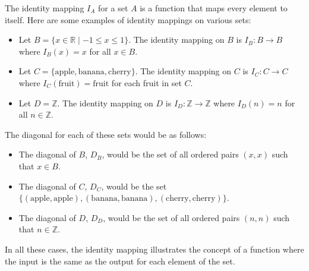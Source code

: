    \begin{example}
   	The identity mapping $I_A$ for a set $A$ is a function that maps every element to itself. Here are some examples of identity mappings on various sets:
   	
   	\begin{itemize}
   		\item Let $B = \{x \in \mathbb{R} \mid -1 \leq x \leq 1\}$. The identity mapping on $B$ is $I_B : B \to B$ where $I_B(x) = x$ for all $x \in B$.
   		
   		\item Let $C = \{\text{apple}, \text{banana}, \text{cherry}\}$. The identity mapping on $C$ is $I_C : C \to C$ where $I_C(\text{fruit}) = \text{fruit}$ for each fruit in set $C$.
   		
   		\item Let $D = \mathbb{Z}$. The identity mapping on $D$ is $I_D : \mathbb{Z} \to \mathbb{Z}$ where $I_D(n) = n$ for all $n \in \mathbb{Z}$.
   	\end{itemize}
   	
   	The diagonal for each of these sets would be as follows:
   	\begin{itemize}
   		\item The diagonal of $B$, $D_B$, would be the set of all ordered pairs $(x, x)$ such that $x \in B$.
   		
   		\item The diagonal of $C$, $D_C$, would be the set $\{(\text{apple}, \text{apple}), (\text{banana}, \text{banana}), (\text{cherry}, \text{cherry})\}$.
   		
   		\item The diagonal of $D$, $D_D$, would be the set of all ordered pairs $(n, n)$ such that $n \in \mathbb{Z}$.
   	\end{itemize}
   	
   	In all these cases, the identity mapping illustrates the concept of a function where the input is the same as the output for each element of the set.
   \end{example}
